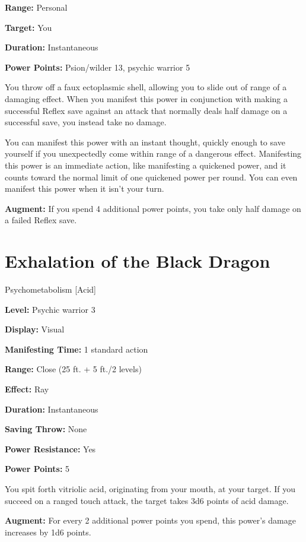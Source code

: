 \documentclass{article}
\begin{document}
\textbf{Range:} Personal

\textbf{Target:} You

\textbf{Duration:} Instantaneous

\textbf{Power Points:} Psion/wilder 13, psychic warrior 5

You throw off a faux ectoplasmic shell, allowing you to slide out of range of a 
damaging effect. When you manifest this power in conjunction with making a successful 
Reflex save against an attack that normally deals half damage on a successful save, 
you instead take no damage.

You can manifest this power with an instant thought, quickly enough to save yourself 
if you unexpectedly come within range of a dangerous effect. Manifesting this power 
is an immediate action, like manifesting a quickened power, and it counts toward 
the normal limit of one quickened power per round. You can even manifest this power 
when it isn't your turn.

\textbf{Augment:} If you spend 4 additional power points, you take only half damage 
on a failed Reflex save.

\vspace{12pt}
\section*{Exhalation of the Black Dragon}

Psychometabolism [Acid]

\textbf{Level:} Psychic warrior 3

\textbf{Display:} Visual

\textbf{Manifesting Time:} 1 standard action

\textbf{Range:} Close (25 ft. + 5 ft./2 levels)

\textbf{Effect:} Ray

\textbf{Duration:} Instantaneous

\textbf{Saving Throw:} None

\textbf{Power Resistance:} Yes

\textbf{Power Points:} 5

You spit forth vitriolic acid, originating from your mouth, at your target. If 
you succeed on a ranged touch attack, the target takes 3d6 points of acid damage.

\textbf{Augment:} For every 2 additional power points you spend, this power's damage 
increases by 1d6 points.

\vspace{12pt}
\end{document}
